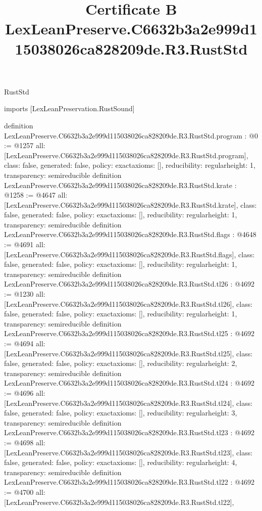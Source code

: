 \begin{lexlean}{RustStd}
\title{Certificate B LexLeanPreserve.C6632b3a2e999d115038026ca828209de.R3.RustStd}
\begin{coremodule}
imports [LexLeanPreservation.RustSound]

definition LexLeanPreserve.C6632b3a2e999d115038026ca828209de.R3.RustStd.program : @0 := @1257 {
  all: [LexLeanPreserve.C6632b3a2e999d115038026ca828209de.R3.RustStd.program],
  class: false,
  generated: false,
  policy: exact{axioms: []},
  reducibility: regular{height: 1},
  transparency: semireducible
}
definition LexLeanPreserve.C6632b3a2e999d115038026ca828209de.R3.RustStd.krate : @1258 := @4647 {
  all: [LexLeanPreserve.C6632b3a2e999d115038026ca828209de.R3.RustStd.krate],
  class: false,
  generated: false,
  policy: exact{axioms: []},
  reducibility: regular{height: 1},
  transparency: semireducible
}
definition LexLeanPreserve.C6632b3a2e999d115038026ca828209de.R3.RustStd.flags : @4648 := @4691 {
  all: [LexLeanPreserve.C6632b3a2e999d115038026ca828209de.R3.RustStd.flags],
  class: false,
  generated: false,
  policy: exact{axioms: []},
  reducibility: regular{height: 1},
  transparency: semireducible
}
definition LexLeanPreserve.C6632b3a2e999d115038026ca828209de.R3.RustStd.tl26 : @4692 := @1230 {
  all: [LexLeanPreserve.C6632b3a2e999d115038026ca828209de.R3.RustStd.tl26],
  class: false,
  generated: false,
  policy: exact{axioms: []},
  reducibility: regular{height: 1},
  transparency: semireducible
}
definition LexLeanPreserve.C6632b3a2e999d115038026ca828209de.R3.RustStd.tl25 : @4692 := @4694 {
  all: [LexLeanPreserve.C6632b3a2e999d115038026ca828209de.R3.RustStd.tl25],
  class: false,
  generated: false,
  policy: exact{axioms: []},
  reducibility: regular{height: 2},
  transparency: semireducible
}
definition LexLeanPreserve.C6632b3a2e999d115038026ca828209de.R3.RustStd.tl24 : @4692 := @4696 {
  all: [LexLeanPreserve.C6632b3a2e999d115038026ca828209de.R3.RustStd.tl24],
  class: false,
  generated: false,
  policy: exact{axioms: []},
  reducibility: regular{height: 3},
  transparency: semireducible
}
definition LexLeanPreserve.C6632b3a2e999d115038026ca828209de.R3.RustStd.tl23 : @4692 := @4698 {
  all: [LexLeanPreserve.C6632b3a2e999d115038026ca828209de.R3.RustStd.tl23],
  class: false,
  generated: false,
  policy: exact{axioms: []},
  reducibility: regular{height: 4},
  transparency: semireducible
}
definition LexLeanPreserve.C6632b3a2e999d115038026ca828209de.R3.RustStd.tl22 : @4692 := @4700 {
  all: [LexLeanPreserve.C6632b3a2e999d115038026ca828209de.R3.RustStd.tl22],
}
\end{coremodule}
\end{lexlean}
